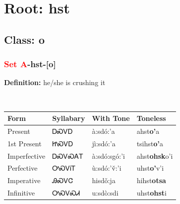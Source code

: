 \needspace{4in}
\section*{Root: hst}
\nopagebreak
{}
\needspace{3in}
\subsection*{Class: o}
\nopagebreak
\needspace{2in}
\subsubsection*{\textcolor{Red}{Set A}{-}\textbf{hst}{-}[o]}
\nopagebreak
\textbf{Definition: } he/she is crushing it
\\[0.5em]
\begin{tabularx}{\textwidth}{l X X X}%
\toprule%
\textbf{Form}&\textbf{Syllabary}&\textbf{With Tone}&\textbf{Toneless}\\%
\midrule%
Present&ᎠᏍᏙᎠ&à:sdó:’a&ahst\textbf{o'}a\\%
1st Present&ᏥᏍᏙᎠ&jì:sdó:’a&tsihst\textbf{o'}a\\%
Imperfective&ᎠᏍᏙᏍᎪᎢ&à:sdó:sgó:’i&ahst\textbf{ohsk}o'i\\%
Perfective&ᎤᏍᏙᎥᎢ&ù:sdó:’v̌:’i&uhst\textbf{o'}v'i\\%
Imperative&ᎯᏍᏙᏣ&hisdǒ:ja&hihst\textbf{otsa}\\%
Infinitive&ᎤᏍᏙᏍᏗ&u:sdò:sdi&uhst\textbf{ohst}i\\%
\bottomrule%
\end{tabularx}
\\[1em]